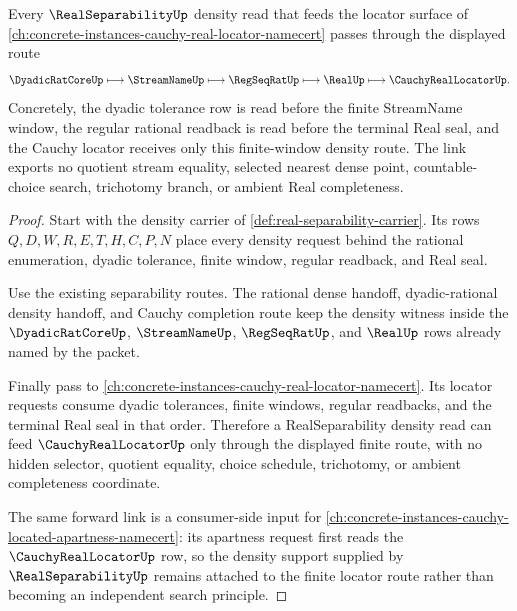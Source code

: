 \begin{theorem}
\label{thm:real-separability-cauchy-locator-forward-link}
Every $\RealSeparabilityUp$ density read that feeds the locator surface of \autoref{ch:concrete-instances-cauchy-real-locator-namecert} passes through the displayed route
$$
\DyadicRatCoreUp \longmapsto \StreamNameUp \longmapsto \RegSeqRatUp \longmapsto \RealUp \longmapsto \CauchyRealLocatorUp .
$$
Concretely, the dyadic tolerance row is read before the finite StreamName window, the regular rational readback is read before the terminal Real seal, and the Cauchy locator receives only this finite-window density route. The link exports no quotient stream equality, selected nearest dense point, countable-choice search, trichotomy branch, or ambient Real completeness.
\end{theorem}
\begin{proof}
Start with the density carrier of \autoref{def:real-separability-carrier}. Its rows $Q,D,W,R,E,T,H,C,P,N$ place every density request behind the rational enumeration, dyadic tolerance, finite window, regular readback, and Real seal.

Use the existing separability routes. The rational dense handoff, dyadic-rational density handoff, and Cauchy completion route keep the density witness inside the $\DyadicRatCoreUp$, $\StreamNameUp$, $\RegSeqRatUp$, and $\RealUp$ rows already named by the packet.

Finally pass to \autoref{ch:concrete-instances-cauchy-real-locator-namecert}. Its locator requests consume dyadic tolerances, finite windows, regular readbacks, and the terminal Real seal in that order. Therefore a RealSeparability density read can feed $\CauchyRealLocatorUp$ only through the displayed finite route, with no hidden selector, quotient equality, choice schedule, trichotomy, or ambient completeness coordinate.

The same forward link is a consumer-side input for \autoref{ch:concrete-instances-cauchy-located-apartness-namecert}: its apartness request first reads the $\CauchyRealLocatorUp$ row, so the density support supplied by $\RealSeparabilityUp$ remains attached to the finite locator route rather than becoming an independent search principle.
\end{proof}
